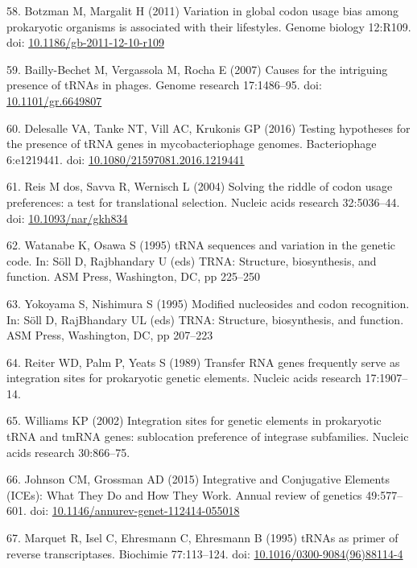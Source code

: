 \documentclass[12pt,twoside]{mitthesis-manusdown}
\begin{document}
\hypertarget{ref-Botzman2011}{}
58. Botzman M, Margalit H (2011) Variation in global codon usage bias
among prokaryotic organisms is associated with their lifestyles. Genome
biology 12:R109. doi:
\href{https://doi.org/10.1186/gb-2011-12-10-r109}{10.1186/gb-2011-12-10-r109}

\hypertarget{ref-Bailly-Bechet2007}{}
59. Bailly-Bechet M, Vergassola M, Rocha E (2007) Causes for the
intriguing presence of tRNAs in phages. Genome research 17:1486--95.
doi: \href{https://doi.org/10.1101/gr.6649807}{10.1101/gr.6649807}

\hypertarget{ref-Delesalle2016}{}
60. Delesalle VA, Tanke NT, Vill AC, Krukonis GP (2016) Testing
hypotheses for the presence of tRNA genes in mycobacteriophage genomes.
Bacteriophage 6:e1219441. doi:
\href{https://doi.org/10.1080/21597081.2016.1219441}{10.1080/21597081.2016.1219441}

\hypertarget{ref-DosReis2004}{}
61. Reis M dos, Savva R, Wernisch L (2004) Solving the riddle of codon
usage preferences: a test for translational selection. Nucleic acids
research 32:5036--44. doi:
\href{https://doi.org/10.1093/nar/gkh834}{10.1093/nar/gkh834}

\hypertarget{ref-Watanabe1995}{}
62. Watanabe K, Osawa S (1995) tRNA sequences and variation in the
genetic code. In: Söll D, Rajbhandary U (eds) TRNA: Structure,
biosynthesis, and function. ASM Press, Washington, DC, pp 225--250

\hypertarget{ref-Yokoyama1995}{}
63. Yokoyama S, Nishimura S (1995) Modified nucleosides and codon
recognition. In: Söll D, RajBhandary UL (eds) TRNA: Structure,
biosynthesis, and function. ASM Press, Washington, DC, pp 207--223

\hypertarget{ref-Reiter1989}{}
64. Reiter WD, Palm P, Yeats S (1989) Transfer RNA genes frequently
serve as integration sites for prokaryotic genetic elements. Nucleic
acids research 17:1907--14.

\hypertarget{ref-Williams2002}{}
65. Williams KP (2002) Integration sites for genetic elements in
prokaryotic tRNA and tmRNA genes: sublocation preference of integrase
subfamilies. Nucleic acids research 30:866--75.

\hypertarget{ref-Johnson2015}{}
66. Johnson CM, Grossman AD (2015) Integrative and Conjugative Elements
(ICEs): What They Do and How They Work. Annual review of genetics
49:577--601. doi:
\href{https://doi.org/10.1146/annurev-genet-112414-055018}{10.1146/annurev-genet-112414-055018}

\hypertarget{ref-Marquet1995}{}
67. Marquet R, Isel C, Ehresmann C, Ehresmann B (1995) tRNAs as primer
of reverse transcriptases. Biochimie 77:113--124. doi:
\href{https://doi.org/10.1016/0300-9084(96)88114-4}{10.1016/0300-9084(96)88114-4}
\end{document}
